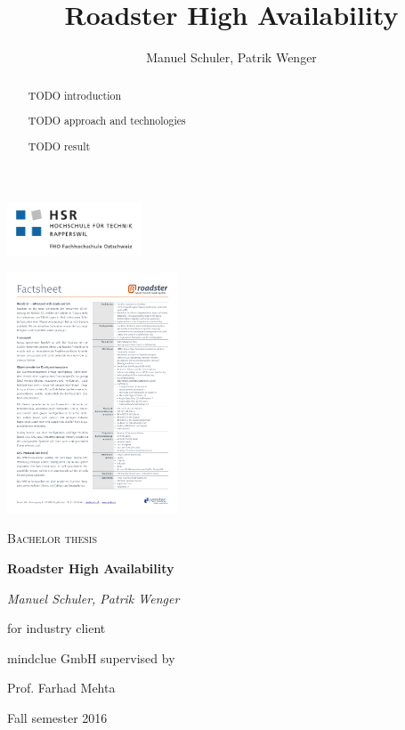 \documentclass[a4paper]{report}
\title{Roadster High Availability}
\author{Manuel Schuler, Patrik Wenger}
\begin{document}
\thispagestyle{empty}

\begin{titlepage}
\centering
\begin{raggedleft}\includegraphics[trim=10 10 10 10, clip=true, width=0.3\textwidth]{img/hsr_logo.pdf}\end{raggedleft}
\begin{raggedright}\hfill\includegraphics[trim=14.8cm 27cm 1cm 1.4cm, clip=true, width=0.38\textwidth]{img/roadster_factsheet.pdf}\end{raggedright}

\par\vspace{30mm}
{\scshape\Large Bachelor thesis\par}
\vspace{1.5cm}
{\huge\bfseries Roadster High Availability\par}
\vspace{2cm}
{\Large\itshape Manuel Schuler, Patrik Wenger\par}
\vfill
for industry client\par
mindclue GmbH
\vfill
supervised by\par
Prof. Farhad Mehta

\vfill

{\large Fall semester 2016\par}
\end{titlepage}

\begin{abstract}

TODO introduction

TODO approach and technologies

TODO result

\end{abstract}
\end{document}

